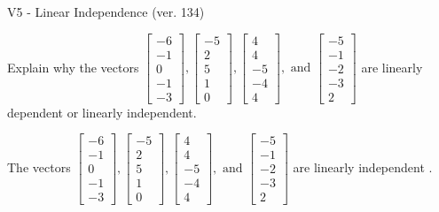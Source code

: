 \begin{exercise}
  \begin{exerciseTitle}V5 - Linear Independence (ver. 134)\end{exerciseTitle}
  \begin{exerciseStatement}
    Explain why the vectors \(\left[\begin{array}{r}
-6 \\
-1 \\
0 \\
-1 \\
-3
\end{array}\right] , \left[\begin{array}{r}
-5 \\
2 \\
5 \\
1 \\
0
\end{array}\right] , \left[\begin{array}{r}
4 \\
4 \\
-5 \\
-4 \\
4
\end{array}\right] , \text{ and } \left[\begin{array}{r}
-5 \\
-1 \\
-2 \\
-3 \\
2
\end{array}\right]\) are linearly dependent or linearly independent.	


  \end{exerciseStatement}
  \begin{exerciseAnswer}
   The vectors \(\left[\begin{array}{r}
-6 \\
-1 \\
0 \\
-1 \\
-3
\end{array}\right] , \left[\begin{array}{r}
-5 \\
2 \\
5 \\
1 \\
0
\end{array}\right] , \left[\begin{array}{r}
4 \\
4 \\
-5 \\
-4 \\
4
\end{array}\right] , \text{ and } \left[\begin{array}{r}
-5 \\
-1 \\
-2 \\
-3 \\
2
\end{array}\right]\) are 
  	 linearly independent  .
  


  \end{exerciseAnswer}
\end{exercise}